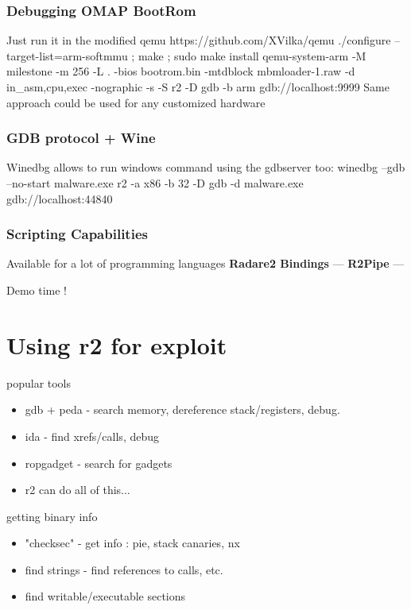 \documentclass[10pt,pdf,utf8,english,compress,hyperref={unicode}]{beamer}
\begin{document}
\begin{frame}[fragile]
  \frametitle{Debugging OMAP BootRom}
  \center Just run it in the modified qemu https://github.com/XVilka/qemu
  \center ./configure --target-list=arm-softmmu ; make ; sudo make install
  \center qemu-system-arm -M milestone -m 256 -L . -bios bootrom.bin -mtdblock	mbmloader-1.raw -d in\_asm,cpu,exec -nographic -s -S
  \center r2 -D gdb -b arm gdb://localhost:9999
  \center Same approach could be used for any customized hardware
\end{frame}


\begin{frame}[fragile]
  \frametitle{GDB protocol + Wine}
  \center Winedbg allows to run windows command
  \center using the gdbserver too:
  \center winedbg --gdb --no-start malware.exe
  \center r2 -a x86 -b 32 -D gdb -d malware.exe gdb://localhost:44840
\end{frame}


\begin{frame}[fragile]
  \frametitle{Scripting Capabilities}
  \center Available for a lot of programming languages
  \center\textbf{Radare2 Bindings} —
  \center\textbf{R2Pipe} —
  \noindent\makebox[\linewidth]{\rule{\paperwidth}{0.4pt}}
  \item Demo time !
\end{frame}

\section{Using r2 for exploit}
\begin{frame}{popular tools}
	\begin{itemize}
		\item gdb + peda - search memory, dereference stack/registers, debug.
		\item ida - find xrefs/calls, debug
		\item ropgadget - search for gadgets
		\item r2 can do all of this...
	\end{itemize}
\end{frame}

\begin{frame}{getting binary info}
	\begin{itemize}
		\item "checksec" - get info : pie, stack canaries, nx
		\item find strings - find references to calls, etc.
		\item find writable/executable sections
	\end{itemize}
\end{frame}
\end{document}
